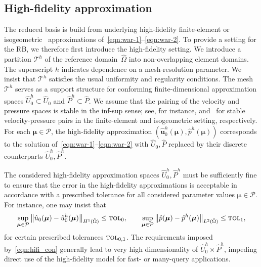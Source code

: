 \documentclass[onecolumn, twoside, a4paper, 11pt]{article}
\begin{document}
\subsection{High-fidelity approximation}
The reduced basis is build from underlying high-fidelity finite-element or isogeometric~\cite{Cottrell2009iat}
approximations of~\eqref{eqn:war-1}--\eqref{eqn:war-2}. To provide a setting for the RB, we therefore
first introduce the high-fidelity setting.
We introduce a partition $\mathcal{T}^h$ of the reference domain~$\hat{\Omega}$ into non-overlapping
element domains. The superscript $h$ indicates dependence
on a mesh-resolution parameter. We insist that $\mathcal{T}^h$ satisfies the usual uniformity and
regularity conditions. The mesh $\mathcal{T}^h$ serves as a support structure for conforming
finite-dimensional approximation spaces $\hat{U}_0^h\subset\hat{U}_0$ and $\hat{P}^h\subset\hat{P}$.
We assume that the pairing of the velocity and pressure spaces is stable in the inf-sup sense; see,
for instance, \cite{} and~\cite{} for stable velocity-pressure pairs in the finite-element and isogeometric setting,
respectively. For each $\bm{\mu}\in\mathcal{P}$, the high-fidelity approximation
$(\hat{\bm{u}}_0^h(\bm{\mu}),\hat{p}^h(\bm{\mu}))$ corresponds to the solution
of~\eqref{eqn:war-1}\nobreakdash--\eqref{eqn:war-2} with $\hat{U}_0,\hat{P}$ replaced by their
discrete counterparts $\hat{U}_0^h,\hat{P}^h$.

The considered high-fidelity approximation spaces $\hat{U}_0^h,\hat{P}^h$ must be sufficiently fine to
ensure that the error in the high-fidelity approximations is acceptable in accordance with a prescribed tolerance
for all considered parameter values $\bm{\mu}\in\mathcal{P}$. For instance, one may insist that
%
\begin{equation}
\label{eqn:hifi_con}
\sup_{\bm{\mu}\in\mathcal{P}}
\big\|\hat{u}_0(\bm{\mu})-\hat{u}_0^h(\bm{\mu})\big\|_{H^1(\hat{\Omega})}\leq\textsc{tol}_0,
\qquad
\sup_{\bm{\mu}\in\mathcal{P}}
\big\|\hat{p}(\bm{\mu})-\hat{p}^h(\bm{\mu})\big\|_{L^2(\hat{\Omega})}\leq\textsc{tol}_1,
\end{equation}
%
for certain prescribed tolerances $\textsc{tol}_{0,1}$.
The requirements imposed by~\eqref{eqn:hifi_con} generally lead to very high dimensionality of $\hat{U}_0^h\times\hat{P}^h$,
impeding direct use of the high-fidelity model for fast- or many-query applications.
\end{document}
